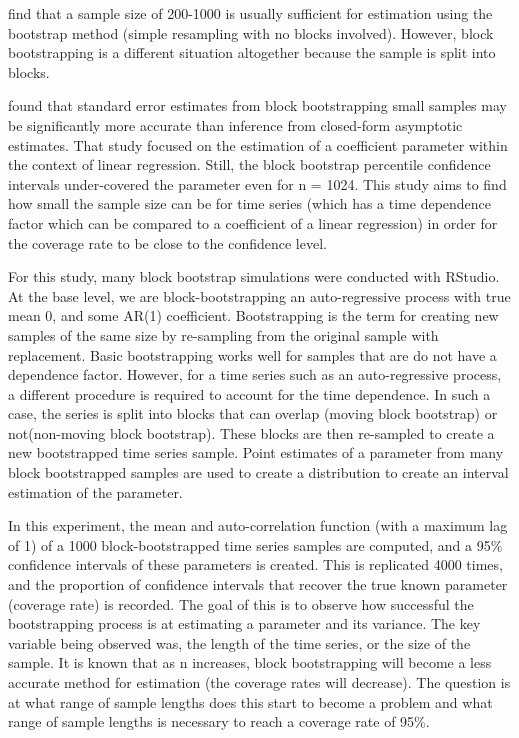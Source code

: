 \documentclass[12pt, letterpaper, titlepage]{article}
\begin{document}
\citet{nevitt2001performance} find that a sample size of 200-1000 is usually sufficient for estimation using the bootstrap method (simple resampling with no blocks involved). However, block bootstrapping is a different situation altogether because the sample is split into blocks.

\citet{goncalves2005bootstrap} found that standard error estimates from block bootstrapping small 
samples 
may be significantly more accurate than inference from closed-form asymptotic estimates. That study focused on the estimation of a coefficient parameter within the context of linear regression. Still, the block bootstrap percentile confidence intervals under-covered the parameter even for n = 1024. This study aims to find how small the sample size can be for time series (which has a time dependence factor which can be compared to a coefficient of a linear regression) in order for the coverage rate to be close to the confidence level.

For this study, many block bootstrap simulations were conducted with RStudio. At the base
level, we are block-bootstrapping an auto-regressive process with true mean 0, and some AR(1) coefficient.
Bootstrapping is the term for creating new samples of the same size by re-sampling from
the original sample with replacement. Basic bootstrapping works well for samples
that are do not have a dependence factor. However, for a time series such as an auto-regressive process,
a different procedure is required to account for the time dependence. In such a case,
the series is split into blocks that can overlap (moving block bootstrap) or not(non-moving block bootstrap). These blocks are then re-sampled to create a new
bootstrapped time series sample. Point estimates of a parameter from many block bootstrapped samples are used to create a distribution to create an interval estimation of the parameter.

In this experiment, the mean and auto-correlation function (with a maximum lag of 1) of a 1000 block-bootstrapped time series samples are computed, 
and a 95\% confidence intervals of these parameters is created. This is replicated 4000 times, 
and the proportion of confidence intervals that recover the true known parameter 
(coverage rate) is recorded. The goal of this is to observe how successful the bootstrapping process
is at estimating a parameter and its variance. The key variable being observed was, 
the length of the time series, or the size of the sample. It is known that as n
increases, block bootstrapping will become a less accurate method for estimation
(the coverage rates will decrease). The question is at what range of sample lengths does this
start to become a problem and what range of sample lengths is necessary to reach a coverage rate of 95\%.
\end{document}
